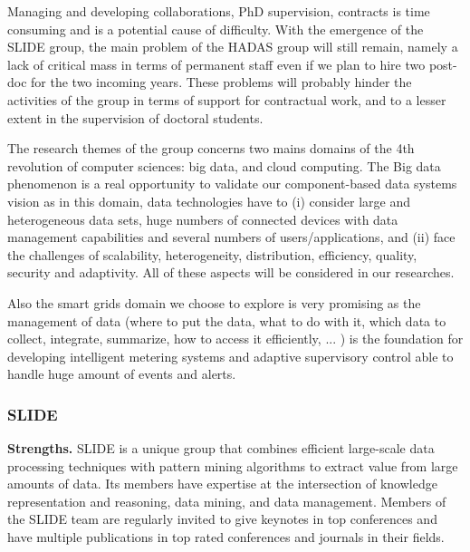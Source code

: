 
Managing and developing collaborations, PhD supervision, contracts is time consuming and is a potential cause of difficulty. 
With the emergence of the SLIDE group, the main problem of the HADAS group will still remain, namely a lack of critical mass in terms of permanent staff even if we plan to hire two post-doc for the two incoming years.  These problems will probably hinder the activities of the group in terms of support for contractual work, and to a lesser extent in the supervision of doctoral students.


The research themes of the group concerns two mains domains of the 4th revolution of computer sciences:  big data, and  cloud computing. The Big data phenomenon is a real opportunity to validate our component-based data systems vision as in this domain, data technologies have to (i) consider large and heterogeneous data sets, huge numbers of connected devices with data management capabilities and several numbers of users/applications,  and (ii) face the challenges of scalability,  heterogeneity, distribution, efficiency, quality, security and adaptivity. All of these aspects will be considered  in our researches. 

Also the  smart grids domain we choose to explore is very promising as the management of data (where to put the data, what to do with it, which data to collect,  integrate, summarize, how to access it efficiently, ... ) is the foundation for developing intelligent metering systems and adaptive supervisory control able to handle huge amount of events and alerts.  


\subsubsection*{SLIDE}

{\bf Strengths.}
SLIDE is a unique group that combines efficient large-scale data
processing techniques with pattern mining algorithms to extract value
from large amounts of data. Its members have expertise at the
intersection of knowledge representation and reasoning, data mining,
and data management. Members of the SLIDE team are regularly invited
to give keynotes in top conferences and have multiple publications in
top rated conferences and journals in their fields.

